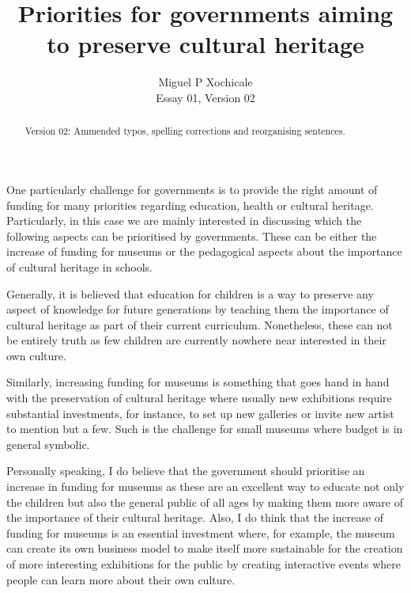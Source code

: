 \documentclass[10pt]{article}
\title{Priorities for governments aiming to preserve cultural heritage}
\author{Miguel P Xochicale\\
Essay 01, Version 02}
\date{ }
\begin{document}
\maketitle
\thispagestyle{empty} %

\begin{abstract}
Version 02: Ammended typos, spelling corrections and reorganising sentences.
\end{abstract}

One particularly challenge for governments is to provide the right amount of funding for 
many priorities regarding education, health or cultural heritage. Particularly,
in this case we are mainly interested in discussing which the following aspects 
can be prioritised by governments. These can be either the increase of funding for museums 
or the pedagogical aspects about the importance of cultural heritage in schools.

Generally, it is believed that education for children is a way to preserve any 
aspect of knowledge for future generations by teaching them the importance of cultural 
heritage as part of their current curriculum. Nonetheless, these can not be entirely 
truth as few children are currently nowhere near interested in their own culture.

Similarly, increasing funding for museums is something that goes hand in hand with 
the preservation of cultural heritage where usually new exhibitions require 
substantial investments, for instance, to set up new galleries or invite new artist
to mention but a few. Such is the challenge for small museums where budget is in
general symbolic.

Personally speaking, I do believe that the government should prioritise an increase 
in funding for museums as these are an excellent way to educate not only the children
but also the general public of all ages by making them more aware of the importance of  
their cultural heritage. 
Also, I do think that the increase of funding for museums is an essential investment
where, for example, the museum can create its own business model to make itself 
more sustainable for the creation of more interesting exhibitions for the public
by creating interactive events where people can learn more about their own culture.
\end{document}
